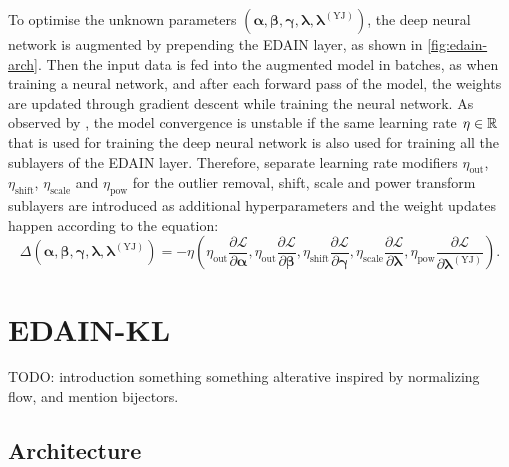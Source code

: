 \documentclass{statsmsc}
\begin{document}
To optimise the unknown parameters
$\left( \bm{\alpha}, \bm{\beta}, \bm{\gamma}, \bm{\lambda}, \bm{\lambda}^{(\textrm{YJ})}\right)$,
the deep neural network is augmented by prepending the \ac{EDAIN} layer, as shown in
\cref{fig:edain-arch}. Then the input data is fed into the augmented model in batches,
as when training a neural network, and after each forward pass of the model, the weights
are updated through gradient descent while training the neural network.
As observed by \citeauthor{dain}, the model convergence is unstable if the same learning rate
$\eta \in \mathbb{R}$ that is used for training the deep neural network is also used for training all
the sublayers of the \ac{EDAIN} layer. Therefore, separate learning rate modifiers
$\eta_{\textrm{out}}$,
$\eta_{\textrm{shift}}$,
$\eta_{\textrm{scale}}$ and
$\eta_{\textrm{pow}}$ for the outlier removal, shift, scale and power transform sublayers are
introduced as additional hyperparameters and the weight updates happen according to the equation:
\begin{equation}
    \Delta \left( \bm{\alpha}, \bm{\beta}, \bm{\gamma}, \bm{\lambda}, \bm{\lambda}^{(\textrm{YJ})}\right)
    =
    -\eta\left( 
        \eta_{\textrm{out}} \frac{\partial \mathcal{L}}{\partial \bm\alpha},
        \eta_{\textrm{out}} \frac{\partial \mathcal{L}}{\partial \bm\beta},
        \eta_{\textrm{shift}} \frac{\partial \mathcal{L}}{\partial \bm\gamma},
        \eta_{\textrm{scale}} \frac{\partial \mathcal{L}}{\partial \bm\lambda},
        \eta_{\textrm{pow}} \frac{\partial \mathcal{L}}{\partial \bm{\lambda}^{(\textrm{YJ})}}
    \right).
\end{equation}




\section{EDAIN-KL}%
\label{sec:EDAIN-KL-method}

TODO: introduction
something something alterative inspired by normalizing flow, and mention bijectors.

\subsection{Architecture}%
\label{sub:Architecture}
\end{document}

